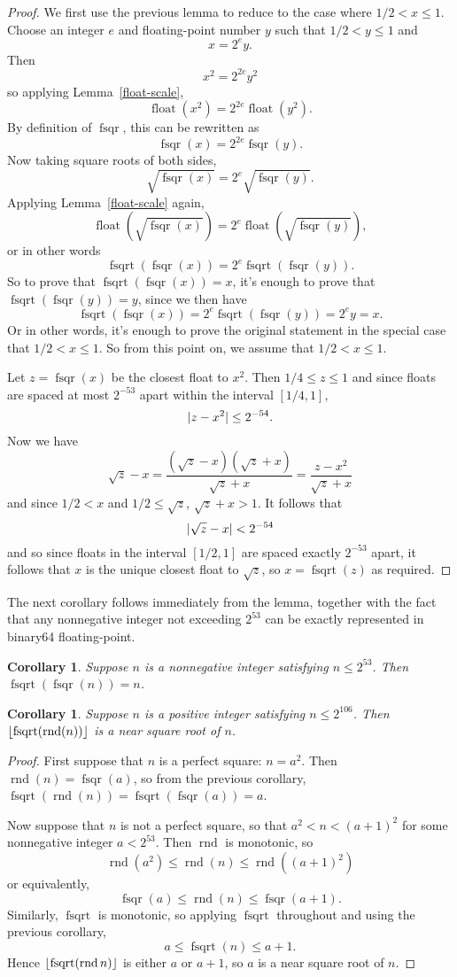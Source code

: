 \documentclass[a4paper]{article}
\DeclarePairedDelimiter\floor{\lfloor}{\rfloor}
\DeclarePairedDelimiter\abs{\lvert}{\rvert}
\DeclareMathOperator{\rnd}{rnd}
\DeclareMathOperator{\fsqrt}{fsqrt}
\DeclareMathOperator{\fsqr}{fsqr}
\DeclareMathOperator{\float}{float}
\theoremstyle{plain}
\newtheorem{corollary}[theorem]{Corollary}
\theoremstyle{definition}
\begin{document}
\begin{proof}
  We first use the previous lemma to reduce to the case where $1/2 < x \le 1$.
  Choose an integer $e$ and floating-point number $y$ such that $1/2 < y \le 1$
  and
  $$x = 2^e y.$$
  Then
  $$x^2 = 2^{2e}y^2$$
  so applying Lemma~\ref{float-scale},
  $$\float(x^2) = 2^{2e}\float(y^2).$$
  By definition of $\fsqr$, this can be rewritten as
  $$\fsqr(x) = 2^{2e}\fsqr(y).$$
  Now taking square roots of both sides,
  $$\sqrt{\fsqr(x)} = 2^e \sqrt{\fsqr(y)}.$$
  Applying Lemma~\ref{float-scale} again,
  $$\float(\sqrt{\fsqr(x)}) = 2^e \float(\sqrt{\fsqr(y)}),$$
  or in other words
  $$\fsqrt(\fsqr(x)) = 2^e \fsqrt(\fsqr(y)).$$
  So to prove that $\fsqrt(\fsqr(x)) = x$, it's enough to prove that
  $\fsqrt(\fsqr(y)) = y$, since we then have
  $$\fsqrt(\fsqr(x)) = 2^e \fsqrt(\fsqr(y)) = 2^e y = x.$$
  Or in other words, it's enough to prove the original statement in the special case that
  $1/2 < x \le 1$. So from this point on, we assume that $1/2 < x \le 1$.

  Let $z = \fsqr(x)$ be the closest float to $x^2$. Then $1/4 \le z \le 1$ and
  since floats are spaced at most $2^{-53}$ apart within the interval $[1/4,
  1]$,
  $$\abs{z - x^2} \le 2^{-54}.$$ Now we have
  $$\sqrt z - x = \frac{(\sqrt z - x)(\sqrt z + x)}{\sqrt z + x} = \frac{z -
  x^2}{\sqrt z + x}$$ and since $1/2 < x$ and $1/2 \le \sqrt z $, $\sqrt z + x
  > 1$. It follows that
  $$\abs{\sqrt z - x} < 2^{-54}$$ and so since floats in the interval $[1/2,
  1]$ are spaced exactly $2^{-53}$ apart, it follows that $x$ is the unique
  closest float to $\sqrt z$, so $x = \fsqrt(z)$ as required.
\end{proof}

The next corollary follows immediately from the lemma, together with the
fact that any nonnegative integer not exceeding $2^{53}$ can be exactly
represented in binary64 floating-point.

\begin{corollary}
  Suppose $n$ is a nonnegative integer satisfying $n \le 2^{53}$. Then
  $\fsqrt(\fsqr(n)) = n$.
\end{corollary}

\begin{corollary}
  Suppose $n$ is a positive integer satisfying $n \le 2^{106}$. Then
  $\floor{\fsqrt(\rnd(n))}$ is a near square root of $n$.
\end{corollary}

\begin{proof}
  First suppose that $n$ is a perfect square: $n = a^2$. Then $\rnd(n) =
  \fsqr(a)$, so from the previous corollary, $\fsqrt(\rnd(n)) =
  \fsqrt(\fsqr(a)) = a$.

  Now suppose that $n$ is not a perfect square, so that $a^2 < n < (a+1)^2$
  for some nonnegative integer $a < 2^{53}$. Then $\rnd$ is monotonic, so
    $$\rnd(a^2) \le \rnd(n) \le \rnd((a+1)^2)$$
  or equivalently,
    $$\fsqr(a) \le \rnd(n) \le \fsqr(a+1).$$
  Similarly, $\fsqrt$ is monotonic, so applying $\fsqrt$ throughout
  and using the previous corollary,
    $$a \le \fsqrt(n) \le a + 1.$$
  Hence $\floor{\fsqrt(\rnd n)}$ is either $a$ or $a+1$, so $a$ is a near
  square root of $n$.
\end{proof}
\end{document}
